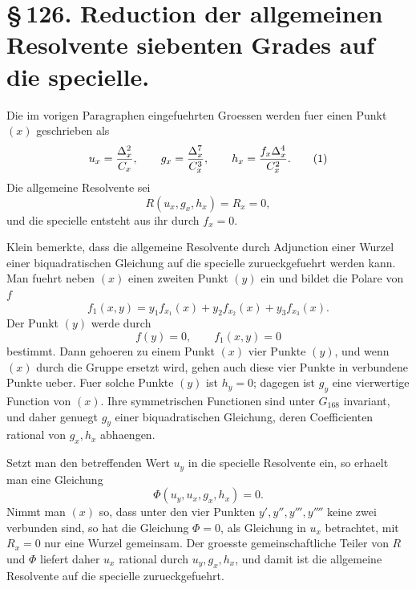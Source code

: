 \documentclass[11pt]{article}
\begin{document}
\section*{\S\,126. Reduction der allgemeinen Resolvente siebenten Grades auf die specielle.}

Die im vorigen Paragraphen eingefuehrten Groessen werden fuer einen Punkt \((x)\) geschrieben als
\begin{equation}
u_x={\Delta_x^2\over C_x},\qquad g_x={\Delta_x^7\over C_x^3},\qquad h_x={f_x\Delta_x^4\over C_x^2}.
\tag{1}
\end{equation}
Die allgemeine Resolvente sei
\begin{equation}
R(u_x,g_x,h_x)=R_x=0,
\tag{2}
\end{equation}
und die specielle entsteht aus ihr durch \(f_x=0\).

Klein bemerkte, dass die allgemeine Resolvente durch Adjunction einer Wurzel einer biquadratischen Gleichung auf die specielle zurueckgefuehrt werden kann. Man fuehrt neben \((x)\) einen zweiten Punkt \((y)\) ein und bildet die Polare von \(f\)
\begin{equation}
f_1(x,y)=y_1f_{x_1}(x)+y_2f_{x_2}(x)+y_3f_{x_3}(x).
\tag{3}
\end{equation}
Der Punkt \((y)\) werde durch
\begin{equation}
f(y)=0,
\qquad
f_1(x,y)=0
\tag{4}
\end{equation}
bestimmt. Dann gehoeren zu einem Punkt \((x)\) vier Punkte \((y)\), und wenn \((x)\) durch die Gruppe ersetzt wird, gehen auch diese vier Punkte in verbundene Punkte ueber. Fuer solche Punkte \((y)\) ist \(h_y=0\); dagegen ist \(g_y\) eine vierwertige Function von \((x)\). Ihre symmetrischen Functionen sind unter \(G_{168}\) invariant, und daher genuegt \(g_y\) einer biquadratischen Gleichung, deren Coefficienten rational von \(g_x,h_x\) abhaengen.

Setzt man den betreffenden Wert \(u_y\) in die specielle Resolvente ein, so erhaelt man eine Gleichung
\begin{equation}
\Phi(u_y,u_x,g_x,h_x)=0.
\tag{5}
\end{equation}
Nimmt man \((x)\) so, dass unter den vier Punkten \(y',y'',y''',y''''\) keine zwei verbunden sind, so hat die Gleichung \(\Phi=0\), als Gleichung in \(u_x\) betrachtet, mit \(R_x=0\) nur eine Wurzel gemeinsam. Der groesste gemeinschaftliche Teiler von \(R\) und \(\Phi\) liefert daher \(u_x\) rational durch \(u_y,g_x,h_x\), und damit ist die allgemeine Resolvente auf die specielle zurueckgefuehrt.
\end{document}
